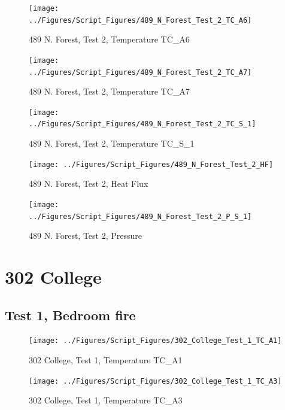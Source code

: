 \documentclass[12pt,oneside]{book}
\begin{document}
\begin{figure}[!ht]
\texttt{[image: ../Figures/Script\_Figures/489\_N\_Forest\_Test\_2\_TC\_A6]}
\caption{489 N. Forest, Test 2, Temperature TC\_A6}
\label{fig:489_N_Forest_Test_2_TC_A6}
\end{figure}

\begin{figure}[!ht]
\texttt{[image: ../Figures/Script\_Figures/489\_N\_Forest\_Test\_2\_TC\_A7]}
\caption{489 N. Forest, Test 2, Temperature TC\_A7}
\label{fig:489_N_Forest_Test_2_TC_A7}
\end{figure}

\begin{figure}[!ht]
\texttt{[image: ../Figures/Script\_Figures/489\_N\_Forest\_Test\_2\_TC\_S\_1]}
\caption{489 N. Forest, Test 2, Temperature TC\_S\_1}
\label{fig:489_N_Forest_Test_2_TC_S_1}
\end{figure}

\begin{figure}[!ht]
\texttt{[image: ../Figures/Script\_Figures/489\_N\_Forest\_Test\_2\_HF]}
\caption{489 N. Forest, Test 2, Heat Flux}
\label{fig:489_N_Forest_Test_2_HF}
\end{figure}

\begin{figure}[!ht]
\texttt{[image: ../Figures/Script\_Figures/489\_N\_Forest\_Test\_2\_P\_S\_1]}
\caption{489 N. Forest, Test 2, Pressure}
\label{fig:489_N_Forest_Test_2_P_S_1}
\end{figure}


\clearpage


\section{302 College}

\subsection{Test 1, Bedroom fire}



\begin{figure}[!ht]
\texttt{[image: ../Figures/Script\_Figures/302\_College\_Test\_1\_TC\_A1]}
\caption{302 College, Test 1, Temperature TC\_A1}
\label{fig:302_College_Test_1_TC_A1}
\end{figure}

\begin{figure}[!ht]
\texttt{[image: ../Figures/Script\_Figures/302\_College\_Test\_1\_TC\_A3]}
\caption{302 College, Test 1, Temperature TC\_A3}
\label{fig:302_College_Test_1_TC_A3}
\end{figure}
\end{document}
